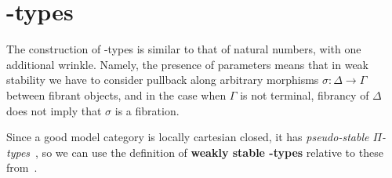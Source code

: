 \documentclass{amsart}
\let\W\iW
\begin{document}
\section{\W-types}
\label{sec:w-types}

The construction of \W-types is similar to that of natural numbers, with one additional wrinkle.
Namely, the presence of parameters means that in weak stability we have to consider pullback along arbitrary morphisms $\sigma:\Delta\to\Gamma$ between fibrant objects, and in the case when $\Gamma$ is not terminal, fibrancy of $\Delta$ does not imply that $\sigma$ is a fibration.

Since a good model category is locally cartesian closed, it has \emph{pseudo-stable $\Pi$-types}~\cite[Definition 3.4.2.8]{lw:localuniv}, so we can use the definition of \textbf{weakly stable \W-types} relative to these from~\cite[Definition 3.4.4.9]{lw:localuniv}.
\end{document}

